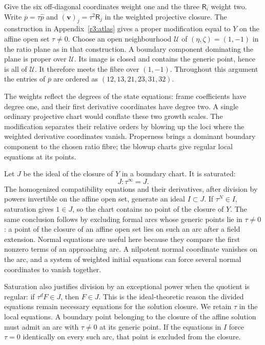 \documentclass[11pt,a4paper]{article}
\numberwithin{equation}{section}
\theoremstyle{plain}
\theoremstyle{definition}
\theoremstyle{remark}
\begin{document}
Give the six off-diagonal coordinates weight one and the three
$\mathsf R_i$ weight two. Write
$\overline p=\tau\widehat p$ and $(\boldsymbol v)_j=\tau^2\mathsf R_j$ in the
weighted projective closure. The construction in
Appendix~\ref{r3:atlas} gives a proper modification equal to $Y$ on
the affine open set $\tau\ne0$. Choose an open neighbourhood
$\mathscr U$ of $(\eta,\zeta)=(1,-1)$ in the ratio plane as in that
construction. A boundary component dominating the plane is proper over
$\mathscr U$. Its image is closed and contains the generic point, hence
is all of $\mathscr U$. It therefore meets the fibre over $(1,-1)$.
Throughout this argument the entries of $\overline p$ are ordered as
$(12,13,21,23,31,32)$.

The weights reflect the degrees of the state equations: frame
coefficients have degree one, and their first derivative
coordinates have degree two. A single ordinary projective chart
would conflate these two growth scales. The modification separates
their relative orders by blowing up the loci where the weighted
derivative coordinates vanish. Properness brings a dominant
boundary component to the chosen ratio fibre; the blowup charts
give regular local equations at its points.

Let $J$
be the ideal of the closure of $Y$ in a
boundary chart. It is saturated:
\[
 J:\tau^\infty=J.
\]
The homogenized compatibility equations and their derivatives, after
division by powers invertible on the affine open set, generate an ideal
$I\subset J$. If $\tau^N\in I$, saturation gives $1\in J$, so the
chart contains no point of the closure of $Y$. The same conclusion
follows by excluding formal arcs whose generic points lie in
$\tau\ne0$: a point of the closure of an affine open set lies on such
an arc after a field extension. Normal equations are useful here
because they compare the first nonzero terms of an approaching arc.
A nilpotent normal coordinate vanishes on the arc, and a system of
weighted initial equations can force several normal coordinates to
vanish together.

Saturation also justifies division by an exceptional power when
the quotient is regular: if $\tau^dF\in J$, then $F\in J$.
This is the ideal-theoretic reason the divided equations remain
necessary equations for the solution closure. We retain $\tau$
in the local equations. A boundary point belonging to the closure
of the affine solution must admit an arc with $\tau\ne0$ at its
generic point. If the equations in $I$ force $\tau=0$ identically
on every such arc, that point is excluded from the closure.
\end{document}
